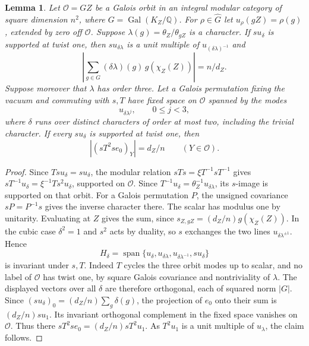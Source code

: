 \documentclass[11pt,a4paper]{article}
\numberwithin{equation}{section}
\newtheorem{lemma}[theorem]{Lemma}
\theoremstyle{remark}
\newcommand{\QQ}{\mathbb Q}
\begin{document}
\begin{lemma}\label{por:lem:cubic-indicator}
Let $\mathcal O=GZ$ be a Galois orbit in an integral modular category of square dimension $n^2$, where $G=\operatorname{Gal}(K_Z/\QQ)$. For $\rho\in\widehat G$ let $u_\rho(gZ)=\rho(g)$, extended by zero off $\mathcal O$. Suppose $\lambda(g)=\theta_Z/\theta_{gZ}$ is a character. If $su_\delta$ is supported at twist one, then $su_{\delta\lambda}$ is a unit multiple of $u_{(\delta\lambda)^{-1}}$ and
\[
            \left|\sum_{g\in G}(\delta\lambda)(g)\,g(\chi_Z(Z))\right|=n/d_Z.
\]
Suppose moreover that $\lambda$ has order three. Let a Galois permutation fixing the vacuum and commuting with $s,T$ have fixed space on $\mathcal O$ spanned by the modes
\[
                 u_{\delta\lambda^j},\qquad 0\le j<3,
\]
where $\delta$ runs over distinct characters of order at most two, including the trivial character. If every $su_\delta$ is supported at twist one, then
\[
                  |(sT^2se_0)_Y|=d_Z/n\qquad(Y\in\mathcal O).
\]
\end{lemma}
\begin{proof}
Since $Tsu_\delta=su_\delta$, the modular relation $sTs=\xi T^{-1}sT^{-1}$ gives $sT^{-1}u_\delta=\xi^{-1}Ts^2u_\delta$, supported on $\mathcal O$. Since $T^{-1}u_\delta=\theta_Z^{-1}u_{\delta\lambda}$, its $s$-image is supported on that orbit. For a Galois permutation $P$, the unsigned covariance $sP=P^{-1}s$ gives the inverse character there. The scalar has modulus one by unitarity. Evaluating at $Z$ gives the sum, since $s_{Z,gZ}=(d_Z/n)g(\chi_Z(Z))$. In the cubic case $\delta^2=1$ and $s^2$ acts by duality, so $s$ exchanges the two lines $u_{\delta\lambda^{\pm1}}$. Hence
\[
       H_\delta=\operatorname{span}\{u_\delta,u_{\delta\lambda},u_{\delta\lambda^{-1}},su_\delta\}
\]
is invariant under $s,T$. Indeed $T$ cycles the three orbit modes up to scalar, and no label of $\mathcal O$ has twist one, by square Galois covariance and nontriviality of $\lambda$. The displayed vectors over all $\delta$ are therefore orthogonal, each of squared norm $|G|$. Since $(su_\delta)_0=(d_Z/n)\sum_g\delta(g)$, the projection of $e_0$ onto their sum is $(d_Z/n)su_1$. Its invariant orthogonal complement in the fixed space vanishes on $\mathcal O$. Thus there $sT^2se_0=(d_Z/n)sT^2u_1$. As $T^2u_1$ is a unit multiple of $u_\lambda$, the claim follows.
\end{proof}
\end{document}
